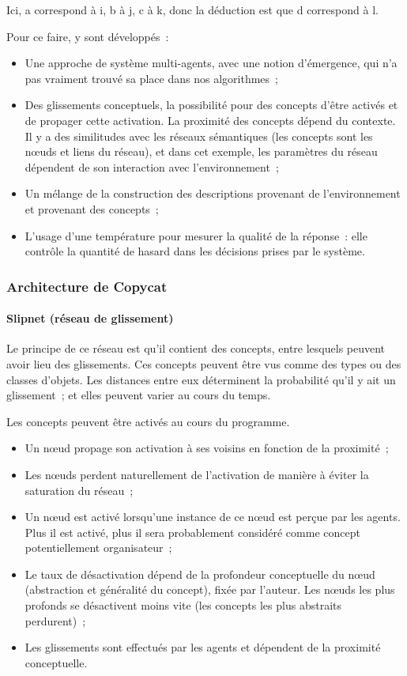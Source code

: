 \documentclass[a4paper, 12pt]{article}
\begin{document}
Ici, a correspond à i, b à j, c à k, donc la déduction est que d correspond à l.

Pour ce faire, y sont développés~:

\begin{itemize}
 \item Une approche de système multi-agents, avec une notion d'émergence, qui n'a pas vraiment trouvé sa place dans nos algorithmes~;
 \item Des glissements conceptuels, la possibilité pour des concepts d'être activés et de propager cette activation. La proximité des concepts dépend du contexte. Il y a des similitudes avec les réseaux sémantiques (les concepts sont les n\oe{}uds et liens du réseau), et dans cet exemple, les paramètres du réseau dépendent de son interaction avec l'environnement~;
 \item Un mélange de la construction des descriptions provenant de l'environnement et provenant des concepts~;
 \item L'usage d'une température pour mesurer la qualité de la réponse~: elle contrôle la quantité de hasard dans les décisions prises par le système.
\end{itemize}

\subsubsection{Architecture de Copycat}

\paragraph{Slipnet (réseau de glissement)}
Le principe de ce réseau est qu'il contient des concepts, entre lesquels peuvent avoir lieu des glissements. Ces concepts peuvent être vus comme des types ou des classes d'objets. Les distances entre eux déterminent la probabilité qu'il y ait un glissement~; et elles peuvent varier au cours du temps.

Les concepts peuvent être activés au cours du programme.

\begin{itemize}
 \item Un n\oe{}ud propage son activation à ses voisins en fonction de la proximité~;
 \item Les n\oe{}uds perdent naturellement de l'activation de manière à éviter la saturation du réseau~;
 \item Un n\oe{}ud est activé lorsqu'une instance de ce n\oe{}ud est perçue par les agents. Plus il est activé, plus il sera probablement considéré comme concept potentiellement organisateur~;
 \item Le taux de désactivation dépend de la profondeur conceptuelle du n\oe{}ud (abstraction et généralité du concept), fixée par l'auteur. Les n\oe{}uds les plus profonds se désactivent moins vite (les concepts les plus abstraits perdurent)~;
 \item Les glissements sont effectués par les agents et dépendent de la proximité conceptuelle.
\end{itemize}
\end{document}
